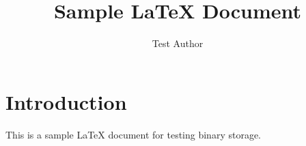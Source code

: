 \documentclass{article}
\begin{document}
\title{Sample \LaTeX{} Document}
\author{Test Author}
\maketitle

\section{Introduction}
This is a sample \LaTeX{} document for testing binary storage.
\end{document}
